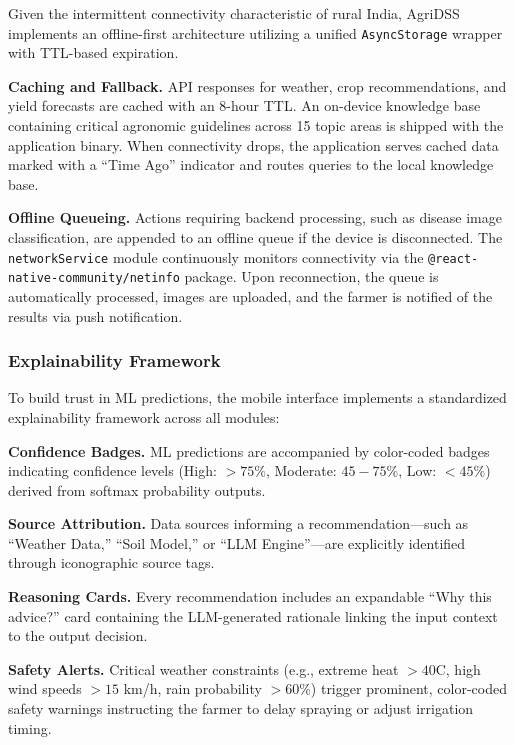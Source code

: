 \documentclass[conference]{IEEEtran}
\begin{document}
Given the intermittent connectivity characteristic of rural India, AgriDSS implements an offline-first architecture utilizing a unified \texttt{AsyncStorage} wrapper with TTL-based expiration.

\textbf{Caching and Fallback.} API responses for weather, crop recommendations, and yield forecasts are cached with an 8-hour TTL. An on-device knowledge base containing critical agronomic guidelines across 15 topic areas is shipped with the application binary. When connectivity drops, the application serves cached data marked with a ``Time Ago'' indicator and routes queries to the local knowledge base.

\textbf{Offline Queueing.} Actions requiring backend processing, such as disease image classification, are appended to an offline queue if the device is disconnected. The \texttt{networkService} module continuously monitors connectivity via the \texttt{@react-native-community/netinfo} package. Upon reconnection, the queue is automatically processed, images are uploaded, and the farmer is notified of the results via push notification.

\subsubsection{Explainability Framework}

To build trust in ML predictions, the mobile interface implements a standardized explainability framework across all modules:

\textbf{Confidence Badges.} ML predictions are accompanied by color-coded badges indicating confidence levels (High: $>75\%$, Moderate: $45-75\%$, Low: $<45\%$) derived from softmax probability outputs.

\textbf{Source Attribution.} Data sources informing a recommendation---such as ``Weather Data,'' ``Soil Model,'' or ``LLM Engine''---are explicitly identified through iconographic source tags.

\textbf{Reasoning Cards.} Every recommendation includes an expandable ``Why this advice?'' card containing the LLM-generated rationale linking the input context to the output decision.

\textbf{Safety Alerts.} Critical weather constraints (e.g., extreme heat $>40$\textdegree C, high wind speeds $>15$ km/h, rain probability $>60\%$) trigger prominent, color-coded safety warnings instructing the farmer to delay spraying or adjust irrigation timing.

\end{document}
